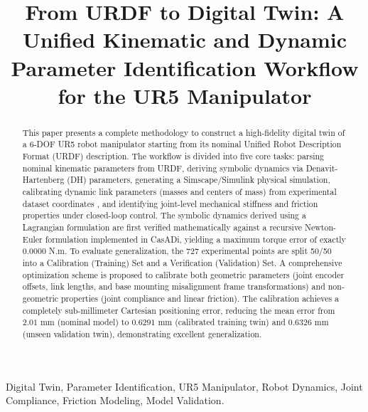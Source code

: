 \documentclass[journal]{IEEEtran}
\begin{document}
\title{From URDF to Digital Twin: A Unified Kinematic and Dynamic Parameter Identification Workflow for the UR5 Manipulator}

\maketitle

\begin{abstract}
This paper presents a complete methodology to construct a high-fidelity digital twin of a 6-DOF UR5 robot manipulator starting from its nominal Unified Robot Description Format (URDF) description. The workflow is divided into five core tasks: parsing nominal kinematic parameters from URDF, deriving symbolic dynamics via Denavit-Hartenberg (DH) parameters, generating a Simscape/Simulink physical simulation, calibrating dynamic link parameters (masses and centers of mass) from experimental dataset coordinates \cite{zhou2026gtpn}, and identifying joint-level mechanical stiffness and friction properties under closed-loop control. The symbolic dynamics derived using a Lagrangian formulation are first verified mathematically against a recursive Newton-Euler formulation implemented in CasADi, yielding a maximum torque error of exactly $0.0000$ N.m. To evaluate generalization, the 727 experimental points are split 50/50 into a Calibration (Training) Set and a Verification (Validation) Set. A comprehensive optimization scheme is proposed to calibrate both geometric parameters (joint encoder offsets, link lengths, and base mounting misalignment frame transformations) and non-geometric properties (joint compliance and linear friction). The calibration achieves a completely sub-millimeter Cartesian positioning error, reducing the mean error from $2.01$ mm (nominal model) to $0.6291$ mm (calibrated training twin) and $0.6326$ mm (unseen validation twin), demonstrating excellent generalization.
\end{abstract}

\begin{IEEEkeywords}
Digital Twin, Parameter Identification, UR5 Manipulator, Robot Dynamics, Joint Compliance, Friction Modeling, Model Validation.
\end{IEEEkeywords}
\end{document}
